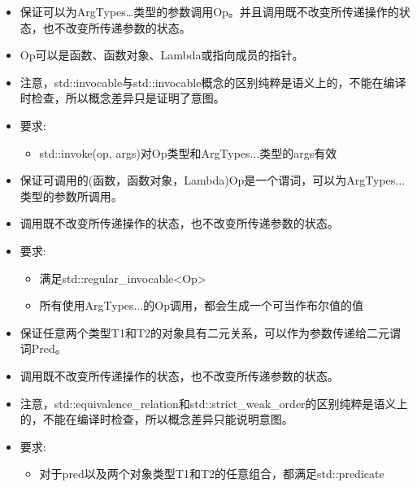 
\begin{itemize}
\item
保证可以为ArgTypes…类型的参数调用Op。并且调用既不改变所传递操作的状态，也不改变所传递参数的状态。

\item
Op可以是函数、函数对象、Lambda或指向成员的指针。

\item
注意，std::invocable与std::invocable概念的区别纯粹是语义上的，不能在编译时检查，所以概念差异只是证明了意图。

\item
要求:
\begin{itemize}
\item
std::invoke(op, args)对Op类型和ArgTypes...类型的args有效
\end{itemize}
\end{itemize}


\begin{itemize}
\item
保证可调用的(函数，函数对象，Lambda)Op是一个谓词，可以为ArgTypes...类型的参数所调用。

\item
调用既不改变所传递操作的状态，也不改变所传递参数的状态。

\item
要求:
\begin{itemize}
\item
满足std::regular\_invocable<Op>

\item
所有使用ArgTypes...的Op调用，都会生成一个可当作布尔值的值
\end{itemize}
\end{itemize}


\begin{itemize}
\item
保证任意两个类型T1和T2的对象具有二元关系，可以作为参数传递给二元谓词Pred。

\item
调用既不改变所传递操作的状态，也不改变所传递参数的状态。

\item
注意，std::equivalence\_relation和std::strict\_weak\_order的区别纯粹是语义上的，不能在编译时检查，所以概念差异只能说明意图。

\item
要求:
\begin{itemize}
\item
对于pred以及两个对象类型T1和T2的任意组合，都满足std::predicate
\end{itemize}
\end{itemize}

